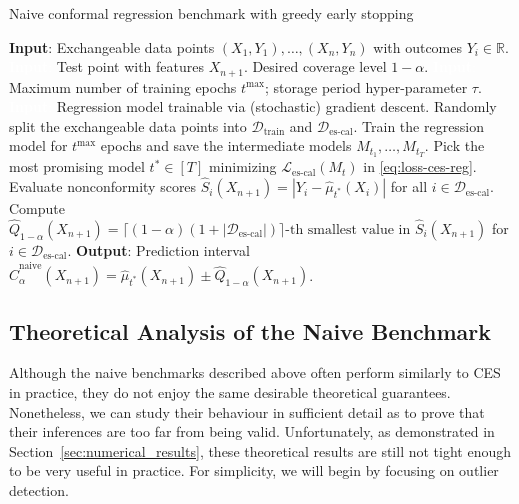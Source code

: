 \begin{algorithm}[H]
    \caption{Naive conformal regression benchmark with greedy early stopping}
    \label{alg:naive-reg}
    \begin{algorithmic}[1]
        \STATE \textbf{Input}: Exchangeable data points $(X_{1},Y_{1}), \ldots, (X_{n},Y_{n})$ with outcomes $Y_i \in \mathbb{R}$.
        \STATE \textcolor{white}{\textbf{Input}:} Test point with features $X_{n+1}$. Desired coverage level $1-\alpha$.
        \STATE \textcolor{white}{\textbf{Input}:} Maximum number of training epochs $t^{\text{max}}$; storage period hyper-parameter $\tau$.
        \STATE \textcolor{white}{\textbf{Input}:} Regression model trainable via (stochastic) gradient descent.
        \STATE Randomly split the exchangeable data points into $\mathcal{D}_{\text{train}}$ and $\mathcal{D}_{\text{es-cal}}$.
        \STATE Train the regression model for $t^{\text{max}}$ epochs and save the intermediate models $M_{t_1} , \dots, M_{t_T}$.
        \STATE Pick the most promising model $t^* \in [T]$ minimizing $\mathcal{L}_{\text{es-cal}}(M_t)$ in \eqref{eq:loss-ces-reg}.
        \STATE Evaluate nonconformity scores $\hat{S}_i(X_{n+1}) = | Y_i - \hat{\mu}_{t^*}(X_{i})|$ for all $i \in \mathcal{D}_{\text{es-cal}}$.
        \STATE Compute $\hat{Q}_{1-\alpha}(X_{n+1}) = \lceil (1-\alpha)(1+|\mathcal{D}_{\text{es-cal}}|) \rceil\text{-th smallest value in }
        \hat{S}_i(X_{n+1})$ for $i \in \mathcal{D}_{\text{es-cal}}$.
        \STATE \textbf{Output}: Prediction interval $\hat{C}^{\text{naive}}_{\alpha}(X_{n+1}) = \hat{\mu}_{t^*}(X_{n+1}) \pm \hat{Q}_{1-\alpha}(X_{n+1})$.
    \end{algorithmic}
\end{algorithm}




\subsection{Theoretical Analysis of the Naive Benchmark} \label{app:naive-analysis}

Although the naive benchmarks described above often perform similarly to CES in practice, they do not enjoy the same desirable theoretical guarantees.
Nonetheless, we can study their behaviour in sufficient detail as to prove that their inferences are too far from being valid.
Unfortunately, as demonstrated in Section~\ref{sec:numerical_results}, these theoretical results are still not tight enough to be very useful in practice.
For simplicity, we will begin by focusing on outlier detection.


